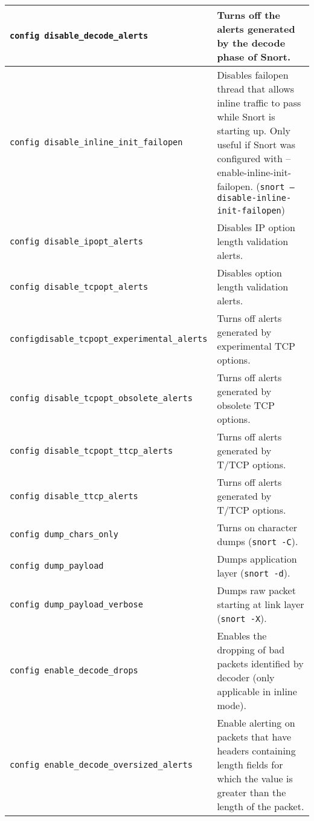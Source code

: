 \documentclass[english]{report}
\begin{document}
\begin{center}
\begin{longtable}[t]{| p{2.5in} | p{3.5in} |}
\hline
\texttt{config disable\_decode\_alerts} & Turns off the alerts generated by the
decode phase of Snort. \\

\hline
\texttt{config disable\_inline\_init\_failopen} & Disables failopen thread that
allows inline traffic to pass while Snort is starting up.  Only useful if Snort
was configured with --enable-inline-init-failopen.  (\texttt{snort
--disable-inline-init-failopen}) \\

\hline
\texttt{config disable\_ipopt\_alerts} & Disables IP option length validation
alerts. \\

\hline
\texttt{config disable\_tcpopt\_alerts} & Disables option length validation
alerts. \\

\hline
\texttt{config\newline disable\_tcpopt\_experimental\_alerts} & Turns off
alerts generated by experimental TCP options. \\

\hline
\texttt{config disable\_tcpopt\_obsolete\_alerts} & Turns off alerts
generated by obsolete TCP options. \\

\hline
\texttt{config disable\_tcpopt\_ttcp\_alerts} & Turns off alerts generated by
T/TCP options. \\

\hline
\texttt{config disable\_ttcp\_alerts} & Turns off alerts generated by T/TCP
options. \\

\hline
\texttt{config dump\_chars\_only} & Turns on character dumps (\texttt{snort
-C}). \\

\hline
\texttt{config dump\_payload} & Dumps application layer (\texttt{snort -d}). \\

\hline
\texttt{config dump\_payload\_verbose} & Dumps raw packet starting at link
layer (\texttt{snort -X}). \\

\hline
\texttt{config enable\_decode\_drops} & Enables the dropping of bad packets
identified by decoder (only applicable in inline mode).\\

\hline
\texttt{config enable\_decode\_oversized\_alerts} & Enable alerting
on packets that have headers containing length fields for which the value is
greater than the length of the packet. \\


\end{longtable}
\end{center}
\end{document}
